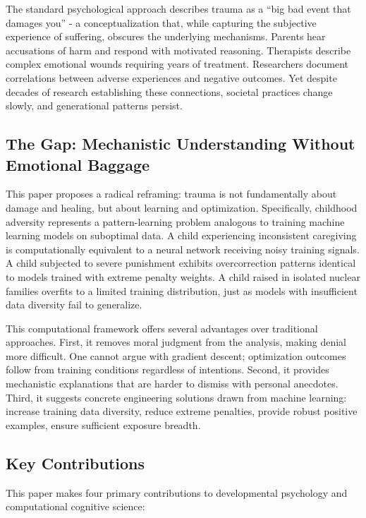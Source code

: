 \documentclass{article}
\begin{document}
The standard psychological approach describes trauma as a ``big bad event that damages you'' - a conceptualization that, while capturing the subjective experience of suffering, obscures the underlying mechanisms. Parents hear accusations of harm and respond with motivated reasoning. Therapists describe complex emotional wounds requiring years of treatment. Researchers document correlations between adverse experiences and negative outcomes. Yet despite decades of research establishing these connections, societal practices change slowly, and generational patterns persist.

\subsection{The Gap: Mechanistic Understanding Without Emotional Baggage}

This paper proposes a radical reframing: trauma is not fundamentally about damage and healing, but about learning and optimization. Specifically, childhood adversity represents a pattern-learning problem analogous to training machine learning models on suboptimal data. A child experiencing inconsistent caregiving is computationally equivalent to a neural network receiving noisy training signals. A child subjected to severe punishment exhibits overcorrection patterns identical to models trained with extreme penalty weights. A child raised in isolated nuclear families overfits to a limited training distribution, just as models with insufficient data diversity fail to generalize.

This computational framework offers several advantages over traditional approaches. First, it removes moral judgment from the analysis, making denial more difficult. One cannot argue with gradient descent; optimization outcomes follow from training conditions regardless of intentions. Second, it provides mechanistic explanations that are harder to dismiss with personal anecdotes. Third, it suggests concrete engineering solutions drawn from machine learning: increase training data diversity, reduce extreme penalties, provide robust positive examples, ensure sufficient exposure breadth.

\subsection{Key Contributions}

This paper makes four primary contributions to developmental psychology and computational cognitive science:
\end{document}
